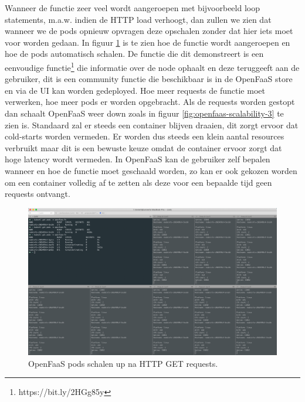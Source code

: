 Wanneer de functie zeer veel wordt aangeroepen met bijvoorbeeld loop statements, m.a.w. indien de HTTP load verhoogt, dan zullen we zien dat wanneer we de pods opnieuw opvragen deze opschalen zonder dat hier iets moet voor worden gedaan. In figuur \ref{fig:openfaas-scalability-2} is te zien hoe de functie wordt aangeroepen en hoe de pods automatisch schalen. De functie die dit demonstreert is een eenvoudige functie\footnote{https://bit.ly/2HGg85y} die informatie over de node ophaalt en deze teruggeeft aan de gebruiker, dit is een community functie die beschikbaar is in de OpenFaaS store en via de UI kan worden gedeployed. Hoe meer requests de functie moet verwerken, hoe meer pods er worden opgebracht. Als de requests worden gestopt dan schaalt OpenFaaS weer down zoals in figuur \ref{fig:openfaas-scalability-3} te zien is. Standaard zal er steeds een container blijven draaien, dit zorgt ervoor dat cold-starts worden vermeden. Er worden dus steeds een klein aantal resources verbruikt maar dit is een bewuste keuze omdat de container ervoor zorgt dat hoge latency wordt vermeden. In OpenFaaS kan de gebruiker zelf bepalen wanneer en hoe de functie moet geschaald worden, zo kan er ook gekozen worden om een container volledig af te zetten als deze voor een bepaalde tijd geen requests ontvangt.

\begin{figure}
    \includegraphics[width=1\textwidth]{img/openfaas-scalability-2.png}
    \caption{OpenFaaS pods schalen up na HTTP GET requests.}
    \label{fig:openfaas-scalability-2}  
\end{figure}


